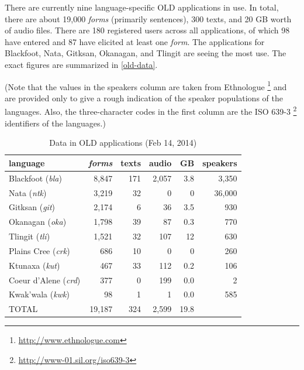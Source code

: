 \documentclass[11pt]{article}
\begin{document}
There are currently nine language-specific OLD applications in use. In total,
there are about 19,000 \emph{forms} (primarily sentences), 300 texts, and 20 GB worth
of audio files.  There are 180 registered users across all applications, of
which 98 have entered and 87 have elicited at least one \emph{form}. The applications
for Blackfoot, Nata, Gitksan, Okanagan, and Tlingit are seeing the most use. The
exact figures are summarized in \autoref{old-data}.

(Note that the values in the speakers column are taken from Ethnologue%
\footnote{\url{http://www.ethnologue.com}} %
and are provided only to give a rough indication of the speaker populations of
the languages. Also, the three-character codes in the first column are the ISO
639-3%
\footnote{\url{http://www-01.sil.org/iso639-3}} %
identifiers of the languages.)


\begin{table}[h]
 \begin{center}
     \scriptsize
\begin{tabular}{lrrrrr}

      \toprule
      language &                     \emph{forms}  & texts & audio & GB   & speakers \\
      \midrule
      Blackfoot (\textit{bla}) &     8,847  & 171   & 2,057 & 3.8  & 3,350    \\ %
      Nata (\textit{ntk}) &          3,219  & 32    & 0     & 0    & 36,000   \\ %
      Gitksan (\textit{git}) &       2,174  & 6     & 36    & 3.5  & 930      \\ %
      Okanagan (\textit{oka}) &      1,798  & 39    & 87    & 0.3  & 770      \\ %
      Tlingit (\textit{tli}) &       1,521  & 32    & 107   & 12   & 630      \\ %
      Plains Cree (\textit{crk}) &   686    & 10    & 0     & 0    & 260      \\ %
      Ktunaxa (\textit{kut}) &       467    & 33    & 112   & 0.2  & 106      \\ %
      Coeur d'Alene (\textit{crd}) & 377    & 0     & 199   & 0.0  & 2        \\ %
      Kwak'wala (\textit{kwk}) &     98     & 1     & 1     & 0.0  & 585      \\ %
      TOTAL &                        19,187 & 324   & 2,599 & 19.8 &         \\ %
      \bottomrule

\end{tabular}
\caption{Data in OLD applications (Feb 14, 2014)}
\label{old-data}
 \end{center}
 \normalsize
\end{table}
\end{document}
